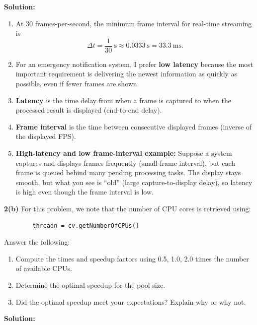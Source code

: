 \documentclass[11pt]{article}
\begin{document}
	\textbf{Solution:}
	\begin{enumerate}
		\item[i.] At 30 frames-per-second, the minimum frame interval for real-time streaming is
		\[
		\Delta t = \frac{1}{30}\ \text{s} \approx 0.0333\ \text{s} = 33.3\ \text{ms}.
		\]
		
		\item[ii.] For an emergency notification system, I prefer \textbf{low latency} because the most important requirement is delivering the newest information as quickly as possible, even if fewer frames are shown.
		
		\item[iii.] \textbf{Latency} is the time delay from when a frame is captured to when the processed result is displayed (end-to-end delay).
		
		\item[iv.] \textbf{Frame interval} is the time between consecutive displayed frames (inverse of the displayed FPS).
		
		\item[v.] \textbf{High-latency and low frame-interval example:} Suppose a system captures and displays frames frequently (small frame interval), but each frame is queued behind many pending processing tasks. The display stays smooth, but what you see is ``old'' (large capture-to-display delay), so latency is high even though the frame interval is low.
	\end{enumerate}
	
	\newpage
	
	\textbf{2(b)} For this problem, we note that the number of CPU cores is retrieved using:
	\begin{verbatim}
		threadn = cv.getNumberOfCPUs()
	\end{verbatim}
	
	Answer the following:
	
	\begin{enumerate}
		\item[i.] Compute the times and speedup factors using 0.5, 1.0, 2.0 times the number of available CPUs.
		
		\item[ii.] Determine the optimal speedup for the pool size.
		
		\item[iii.] Did the optimal speedup meet your expectations? Explain why or why not.
	\end{enumerate}
	
	\textbf{Solution:}
	
\end{document}
